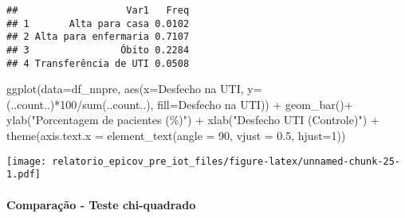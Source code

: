 \documentclass[
]{article}
\newenvironment{Shaded}{\begin{snugshade}}{\end{snugshade}}
\newcommand{\AttributeTok}[1]{\textcolor[rgb]{0.77,0.63,0.00}{#1}}
\newcommand{\DecValTok}[1]{\textcolor[rgb]{0.00,0.00,0.81}{#1}}
\newcommand{\FloatTok}[1]{\textcolor[rgb]{0.00,0.00,0.81}{#1}}
\newcommand{\FunctionTok}[1]{\textcolor[rgb]{0.00,0.00,0.00}{#1}}
\newcommand{\NormalTok}[1]{#1}
\newcommand{\OtherTok}[1]{\textcolor[rgb]{0.56,0.35,0.01}{#1}}
\newcommand{\SpecialCharTok}[1]{\textcolor[rgb]{0.00,0.00,0.00}{#1}}
\newcommand{\StringTok}[1]{\textcolor[rgb]{0.31,0.60,0.02}{#1}}
\begin{document}
\begin{verbatim}
##                   Var1   Freq
## 1       Alta para casa 0.0102
## 2 Alta para enfermaria 0.7107
## 3                Óbito 0.2284
## 4 Transferência de UTI 0.0508
\end{verbatim}

\begin{Shaded}
\begin{Highlighting}[]
\FunctionTok{ggplot}\NormalTok{(}\AttributeTok{data=}\NormalTok{df\_nnpre, }\FunctionTok{aes}\NormalTok{(}\AttributeTok{x=}\StringTok{\textasciigrave{}}\AttributeTok{Desfecho na UTI}\StringTok{\textasciigrave{}}\NormalTok{, }\AttributeTok{y=}\NormalTok{(..count..)}\SpecialCharTok{*}\DecValTok{100}\SpecialCharTok{/}\FunctionTok{sum}\NormalTok{(..count..), }\AttributeTok{fill=}\StringTok{\textasciigrave{}}\AttributeTok{Desfecho na UTI}\StringTok{\textasciigrave{}}\NormalTok{)) }\SpecialCharTok{+}
  \FunctionTok{geom\_bar}\NormalTok{()}\SpecialCharTok{+}
  \FunctionTok{ylab}\NormalTok{(}\StringTok{"Porcentagem de pacientes (\%)"}\NormalTok{) }\SpecialCharTok{+}
  \FunctionTok{xlab}\NormalTok{(}\StringTok{"Desfecho UTI (Controle)"}\NormalTok{) }\SpecialCharTok{+}
  \FunctionTok{theme}\NormalTok{(}\AttributeTok{axis.text.x =} \FunctionTok{element\_text}\NormalTok{(}\AttributeTok{angle =} \DecValTok{90}\NormalTok{, }\AttributeTok{vjust =} \FloatTok{0.5}\NormalTok{, }\AttributeTok{hjust=}\DecValTok{1}\NormalTok{))}
\end{Highlighting}
\end{Shaded}

\texttt{[image: relatorio\_epicov\_pre\_iot\_files/figure-latex/unnamed-chunk-25-1.pdf]}

\hypertarget{comparauxe7uxe3o---teste-chi-quadrado-1}{%
\paragraph{\texorpdfstring{\textbf{Comparação - Teste
chi-quadrado}}{Comparação - Teste chi-quadrado}}\label{comparauxe7uxe3o---teste-chi-quadrado-1}}

\begin{Shaded}
\end{Shaded}
\end{document}
